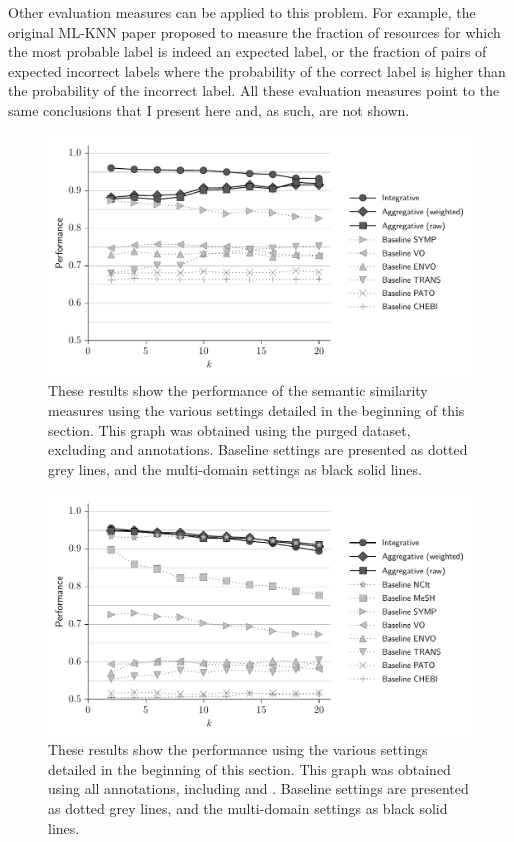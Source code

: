Other evaluation measures can be applied to this problem. For example, the original ML-KNN paper proposed to measure the fraction of resources for which the most probable label is indeed an expected label, or the fraction of pairs of expected \vs incorrect labels where the probability of the correct label is higher than the probability of the incorrect label. All these evaluation measures point to the same conclusions that I present here and, as such, are not shown.

\begin{figure}
    \centering
    \includegraphics[width=0.9\linewidth]{images/epidemic-purge-resnik.pdf}
    \caption[Semantic similarity in the purged Epidemic Marketplace dataset]{These results show the performance of the semantic similarity measures using the various settings detailed in the beginning of this section. This graph was obtained using the purged dataset, \ie excluding  and  annotations. Baseline settings are presented as dotted grey lines, and the multi-domain settings as black solid lines.}
    \label{fig:epiwork-purge}
\end{figure}

\begin{figure}
    \centering
     \includegraphics[width=0.9\linewidth]{images/epidemic-regular-resnik.pdf}
    \caption[Semantic similarity in the raw Epidemic Marketplace dataset]{These results show the performance using the various settings detailed in the beginning of this section. This graph was obtained using all annotations, including  and . Baseline settings are presented as dotted grey lines, and the multi-domain settings as black solid lines.}
    \label{fig:epiwork}
\end{figure}

